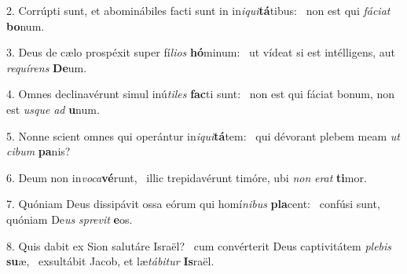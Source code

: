 2. Corrúpti sunt, et abominábiles facti sunt in in\textit{i}\textit{qui}\textbf{tá}tibus: \ast\  non est qui \textit{fá}\textit{ci}\textit{at} \textbf{bo}num.\

3. Deus de cælo prospéxit super fí\textit{li}\textit{os} \textbf{hó}minum: \ast\  ut vídeat si est intélligens, aut \textit{re}\textit{quí}\textit{rens} \textbf{De}um.\

4. Omnes declinavérunt simul inú\textit{ti}\textit{les} \textbf{fac}ti sunt: \ast\  non est qui fáciat bonum, non est \textit{us}\textit{que} \textit{ad} \textbf{u}num.\

5. Nonne scient omnes qui operántur in\textit{i}\textit{qui}\textbf{tá}tem: \ast\  qui dévorant plebem meam \textit{ut} \textit{ci}\textit{bum} \textbf{pa}nis?\

6. Deum non in\textit{vo}\textit{ca}\textbf{vé}runt, \ast\  illic trepidavérunt timóre, ubi \textit{non} \textit{e}\textit{rat} \textbf{ti}mor.\

7. Quóniam Deus dissipávit ossa eórum qui homí\textit{ni}\textit{bus} \textbf{pla}cent: \ast\  confúsi sunt, quóniam De\textit{us} \textit{spre}\textit{vit} \textbf{e}os.\

8. Quis dabit ex Sion salutáre Israël? \dag\  cum convérterit Deus captivitátem \textit{ple}\textit{bis} \textbf{su}æ, \ast\  exsultábit Jacob, et læ\textit{tá}\textit{bi}\textit{tur} \textbf{Is}raël.\

